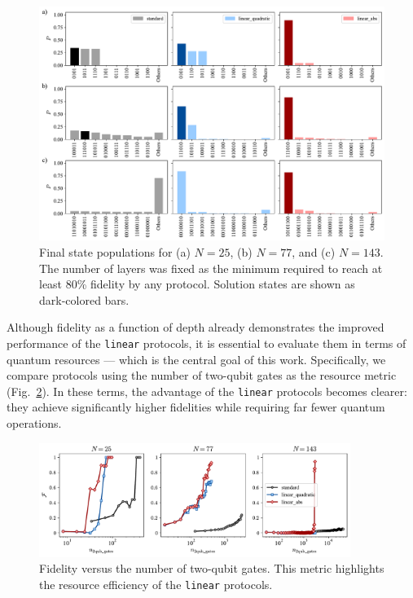\begin{figure}[h]
    \centering
    \includegraphics[width=1\textwidth]{04-results/figs/populations_2577143.pdf}
    \caption{Final state populations for (a) $N=25$, (b) $N=77$, and (c) $N=143$. The number
    of layers was fixed as the minimum required to reach at least 80\% fidelity by any
    protocol. Solution states are shown as dark-colored bars.}
    \label{fig:populations}
\end{figure}

Although fidelity as a function of depth already demonstrates the improved performance of the \texttt{linear} protocols, it is essential to evaluate them in terms of quantum resources --- which is the central goal of this work. Specifically, we compare protocols using the number of two-qubit gates as the resource metric (Fig.~\ref{fig:fidelity_gates}). In these terms, the advantage of the \texttt{linear} protocols becomes clearer: they achieve significantly higher fidelities while requiring far fewer quantum operations.  

\begin{figure}[h]
    \centering
    \includegraphics[width=0.9\textwidth]{04-results/figs/fidelity_gates_2577143.pdf}
    \caption{Fidelity versus the number of two-qubit gates. This metric highlights the resource efficiency of the \texttt{linear} protocols.}
    \label{fig:fidelity_gates}
\end{figure}

